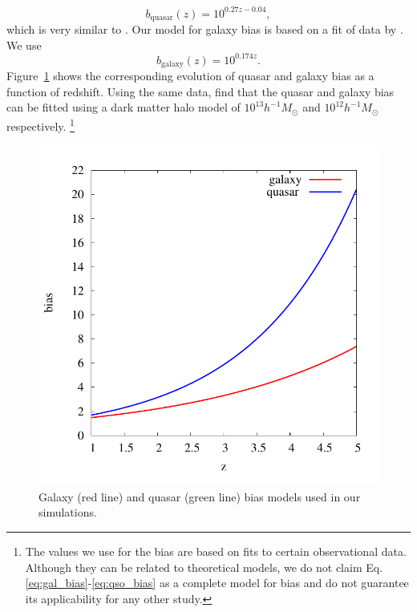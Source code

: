 \documentclass[numberedappendix]{emulateapj}
\newcommand\Cc[1]{{\color{blue} \bf #1}} %
\begin{document}
  \begin{equation}
    \label{eq:gal_bias}
    b_{\mathrm{quasar}}(z)=10^{0.27z-0.04},
  \end{equation}
which is very similar to \citet{2012MNRAS.422..106P}. Our model for galaxy bias is based on a fit of data by \citet{2005A&A...442..801M,1998ApJ...492..428S,2006ApJ...637..631K}. We use
  \begin{equation}
    \label{eq:qso_bias}
    b_{\mathrm{galaxy}}(z)=10^{0.174z}.
  \end{equation}
Figure~\ref{fig:bias} shows the corresponding evolution of quasar and galaxy bias as a function of redshift. Using the same data, \citet{2008ApJ...678..627B} find that the quasar and galaxy bias can be fitted using a dark matter halo model of  $10^{13}h^{-1}M_{\odot}$ and $10^{12}h^{-1} M_{\odot}$ respectively. \footnote{The values we use for the bias are based on fits to certain observational data. Although they can be related to theoretical models, we do not claim Eq. \ref{eq:gal_bias}-\ref{eq:qso_bias} as a complete model for bias and do not guarantee its applicability for any other study.}


\begin{figure}[h]
\centering
\includegraphics[width = .4\textwidth ]{bias}
\caption{Galaxy (red line) and quasar (green line) bias models used in our simulations.}
\label{fig:bias}
\end{figure}
\end{document}
